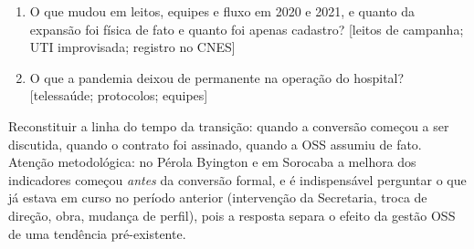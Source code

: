 \begin{enumerate}[itemsep=2pt]
  \item O que mudou em leitos, equipes e fluxo em 2020 e 2021, e quanto da expansão foi física de fato e quanto foi apenas cadastro? [leitos de campanha; UTI improvisada; registro no CNES]
  \par\nopagebreak{}
  \item O que a pandemia deixou de permanente na operação do hospital? [telessaúde; protocolos; equipes]
  \par\nopagebreak{}
\end{enumerate}



Reconstituir a linha do tempo da transição: quando a conversão começou a
ser discutida, quando o contrato foi assinado, quando a OSS assumiu de
fato. Atenção metodológica: no Pérola Byington e em Sorocaba a melhora
dos indicadores começou \emph{antes} da conversão formal, e é
indispensável perguntar o que já estava em curso no período anterior
(intervenção da Secretaria, troca de direção, obra, mudança de perfil),
pois a resposta separa o efeito da gestão OSS de uma tendência
pré-existente.

